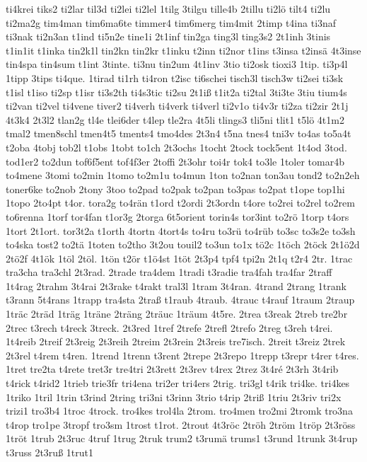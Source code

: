 {ti4krei
tiks2
ti2lar
til3d
ti2lei
ti2lel
1tilg
3tilgu
tille4b
2tillu
ti2lö
tilt4
ti2lu
ti2ma2g
tim4man
tim6ma6te
timmer4
tim6merg
tim4mit
2timp
t4ina
ti3naf
ti3nak
ti2n3an
t1ind
ti5n2e
tine1i
2t1inf
tin2ga
ting3l
ting3s2
2t1inh
3tinis
t1in1it
t1inka
tin2k1l
tin2kn
tin2kr
t1inku
t2inn
ti2nor
t1ins
t3insa
t2insä
4t3inse
tin4spa
tin4sum
t1int
3tinte.
ti3nu
tin2um
4t1inv
3tio
ti2osk
tioxi3
1tip.
ti3p4l
1tipp
3tips
ti4que.
1tirad
ti1rh
ti4ron
t2isc
ti6schei
tisch3l
tisch3w
ti2sei
ti3sk
t1isl
t1iso
ti2sp
t1isr
ti3s2th
ti4s3tic
ti2su
2t1iß
t1it2a
ti2tal
3ti3te
3tiu
tium4s
ti2van
ti2vel
ti4vene
tiver2
ti4verh
ti4verk
ti4verl
ti2v1o
ti4v3r
ti2za
ti2zir
2t1j
4t3k4
2t3l2
tlan2g
tl4e
tlei6der
t4lep
tle2ra
4t5li
tlings3
tli5ni
tlit1
t5lö
4t1m2
tmal2
tmen8schl
tmen4t5
tments4
tmo4des
2t3n4
t5na
tnes4
tni3v
to4as
to5a4t
t2oba
4tobj
tob2l
t1obs
1tobt
to1ch
2t3ochs
1tocht
2tock
tock5ent
1t4od
3tod.
tod1er2
to2dun
tof6f5ent
tof4f3er
2toffi
2t3ohr
toi4r
tok4
to3le
1toler
tomar4b
to4mene
3tomi
to2min
1tomo
to2m1u
to4mun
1ton
to2nan
ton3au
tond2
to2n2eh
toner6ke
to2nob
2tony
3too
to2pad
to2pak
to2pan
to3pas
to2pat
t1ope
top1hi
1topo
2to4pt
t4or.
tora2g
to4rän
t1ord
t2ordi
2t3ordn
t4ore
to2rei
to2rel
to2rem
to6renna
1torf
tor4fan
t1or3g
2torga
6t5orient
torin4s
tor3int
to2rö
1torp
t4ors
1tort
2t1ort.
tor3t2a
t1orth
4tortn
4tort4s
to4ru
to3rü
to4rüb
to3sc
to3s2e
to3sh
to4ska
tost2
to2tä
1toten
to2tho
3t2ou
touil2
to3un
to1x
tö2c
1töch
2töck
2t1ö2d
2tö2f
4t1ök
1töl
2töl.
1tön
t2ör
t1ö4st
1töt
2t3p4
tpf4
tpi2n
2t1q
t2r4
2tr.
1trac
tra3cha
tra3chl
2t3rad.
2trade
tra4dem
1tradi
t3radie
tra4fah
tra4far
2traff
1t4rag
2trahm
3t4rai
2t3rake
t4rakt
tral3l
1tram
3t4ran.
4trand
2trang
1trank
t3rann
5t4rans
1trapp
tra4sta
2traß
t1raub
4traub.
4trauc
t4rauf
1traum
2traup
1träc
2träd
1träg
1träne
2träng
2träuc
1träum
4t5re.
2trea
t3reak
2treb
tre2br
2trec
t3rech
t4reck
3treck.
2t3red
1tref
2trefe
2trefl
2trefo
2treg
t3reh
t4rei.
1t4reib
2treif
2t3reig
2t3reih
2treim
2t3rein
2t3reis
tre7isch.
2treit
t3reiz
2trek
2t3rel
t4rem
t4ren.
1trend
1trenn
t3rent
2trepe
2t3repo
1trepp
t3repr
t4rer
t4res.
1tret
tre2ta
t4rete
tret3r
tre4tri
2t3rett
2t3rev
t4rex
2trez
3t4ré
2t3rh
3t4rib
t4rick
t4rid2
1trieb
trie3fr
tri4ena
tri2er
tri4ers
2trig.
tri3gl
t4rik
tri4ke.
tri4kes
1triko
1tril
1trin
t3rind
2tring
tri3ni
t3rinn
3trio
t4rip
2triß
1triu
2t3riv
tri2x
trizi1
tro3b4
1troc
4trock.
tro4kes
trol4la
2trom.
tro4men
tro2mi
2tromk
tro3na
t4rop
tro1pe
3tropf
tro3sm
1trost
t1rot.
2trout
4t3röc
2tröh
2tröm
1tröp
2t3röss
1tröt
1trub
2t3ruc
4truf
1trug
2truk
trum2
t3rumä
trums1
t3rund
1trunk
3t4rup
t3russ
2t3ruß
1trut1
}
